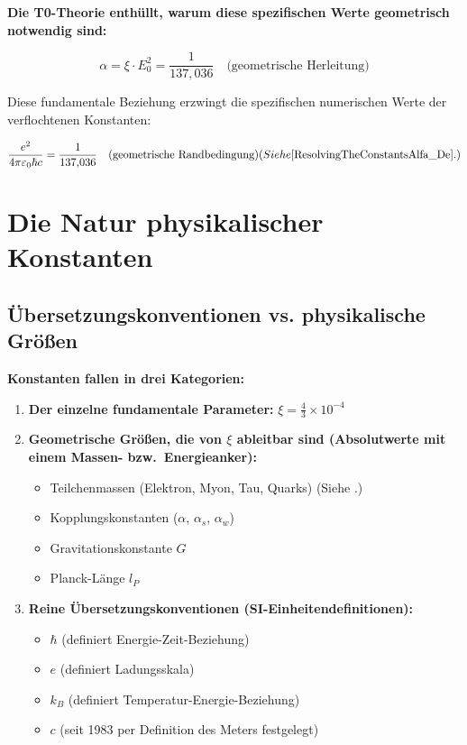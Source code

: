 	\begin{insight}
		\textbf{Die T0-Theorie enthüllt, warum diese spezifischen Werte geometrisch notwendig sind:}
		
		\begin{equation}
			\alpha = \xi \cdot E_0^2 = \frac{1}{137{,}036} \quad \text{(geometrische Herleitung)}
		\end{equation}
		
		Diese fundamentale Beziehung erzwingt die spezifischen numerischen Werte der verflochtenen Konstanten:
		
		\begin{equation}
			\frac{e^2}{4\pi\varepsilon_0\hbar c} = \frac{1}{137{,}036} \quad \text{(geometrische Randbedingung)} (Siehe \cite{ResolvingTheConstantsAlfa_De}.)
		\end{equation}
	\end{insight}
	
	\section{Die Natur physikalischer Konstanten}
	
	\subsection{Übersetzungskonventionen vs. physikalische Größen}
	
	\begin{keyresult}
		\textbf{Konstanten fallen in drei Kategorien:}
		\begin{enumerate}
			\item \textbf{Der einzelne fundamentale Parameter:} $\xi = \frac{4}{3} \times 10^{-4}$
			
			\item \textbf{Geometrische Größen, die von $\xi$ ableitbar sind (Absolutwerte mit einem Massen- bzw.\ Energieanker):}
			\begin{itemize}
				\item Teilchenmassen (Elektron, Myon, Tau, Quarks) (Siehe \cite{Teilchenmassen_De}.)
				\item Kopplungskonstanten ($\alpha$, $\alpha_s$, $\alpha_w$)
				\item Gravitationskonstante $G$
				\item Planck-Länge $l_P$
			\end{itemize}
			
			\item \textbf{Reine Übersetzungskonventionen (SI-Einheitendefinitionen):}
			\begin{itemize}
				\item $\hbar$ (definiert Energie-Zeit-Beziehung)
				\item $e$ (definiert Ladungsskala)
				\item $k_B$ (definiert Temperatur-Energie-Beziehung)
				\item $c$ (seit 1983 per Definition des Meters festgelegt)
			\end{itemize}
		\end{enumerate}
	\end{keyresult}
	
